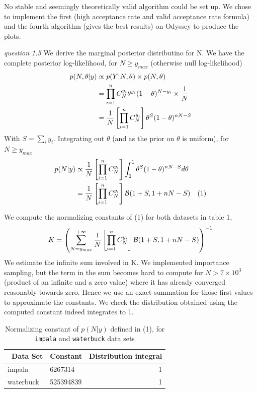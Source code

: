 \documentclass[twoside]{article}
\begin{document}
No stable and seemingly theoretically valid algorithm could be set up. We chose to implement the first (high acceptance rate and valid acceptance rate formula) and the fourth algorithm (gives the best results) on Odyssey to produce the plots.


\vspace{.2 in}
\textit{question 1.5} We derive the marginal posterior distributino for N. We have the complete posterior log-likelihood,  for $N \geqslant y_{max}$ (otherwise null log-likelihood)
\begin{align*}
p(N, \theta | y) & \propto p(Y | N, \theta) \times p(N, \theta)\\
& = \prod_{i = 1}^{n} C_{N}^{y_i} \* \theta^{y_i} \* (1 - \theta)^{N - y_i} \times \frac{1}{N}\\
& = \frac{1}{N} \* \left[ \prod_{i = 1}^{n} C_{N}^{y_i} \right] \* \theta^{S} \* (1 - \theta)^{n \* N - S}\\
\end{align*}
With $ S = \sum_i y_i$. Integrating out $\theta$ (and as the prior on $\theta$ is uniform), for $N \geqslant y_{max}$
\begin{align*}
p(N | y) & \propto \frac{1}{N} \* \left[ \prod_{i = 1}^{n} C_{N}^{y_i} \right] \* \int_0^1 \theta^{S} \* (1 - \theta)^{n \* N - S} d\theta \\
& = \frac{1}{N} \* \left[ \prod_{i = 1}^{n} C_{N}^{y_i} \right] \* \mathcal{B} (1 + S, 1 + n \* N - S) \quad (1)\\
\end{align*}

We compute the normalizing constants of (1) for both datasets in table 1,
\begin{align*}
K = \left( \sum_{N = y_{max}}^{+ \infty} \frac{1}{N} \* \left[ \prod_{i = 1}^{n} C_{N}^{y_i} \right] \* \mathcal{B} (1 + S, 1 + n \* N - S) \right)^{-1}
\end{align*}
We estimate the infinite sum involved in K. We implemented importance sampling, but the term in the sum becomes hard to compute for $N > 7 \times 10^3$ (product of an infinite and a zero value) where it has already converged reasonably towards zero. Hence we use an exact summation for those first values to approximate the constants. We check the distribution obtained using the computed constant indeed integrates to 1.

\begin{table}[H]
\caption{Normalizing constant of $p(N|y)$ defined in (1), for \texttt{impala} and \texttt{waterbuck} data sets}
\centering
\begin{tabular}{llr}
\toprule\
Data Set & Constant & Distribution integral \\
\midrule
impala & 6267314 & 1 \\
waterbuck & 525394839 & 1\\
\bottomrule
\end{tabular}
\end{table}
\end{document}
